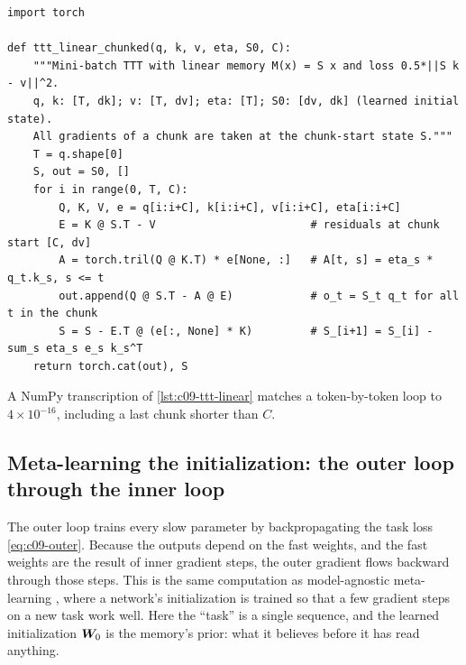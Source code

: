 \begin{lstlisting}[caption={Reference implementation (ours): mini-batch TTT-Linear in its dual form, without the layer norm.},label={lst:c09-ttt-linear}]
import torch

def ttt_linear_chunked(q, k, v, eta, S0, C):
    """Mini-batch TTT with linear memory M(x) = S x and loss 0.5*||S k - v||^2.
    q, k: [T, dk]; v: [T, dv]; eta: [T]; S0: [dv, dk] (learned initial state).
    All gradients of a chunk are taken at the chunk-start state S."""
    T = q.shape[0]
    S, out = S0, []
    for i in range(0, T, C):
        Q, K, V, e = q[i:i+C], k[i:i+C], v[i:i+C], eta[i:i+C]
        E = K @ S.T - V                        # residuals at chunk start [C, dv]
        A = torch.tril(Q @ K.T) * e[None, :]   # A[t, s] = eta_s * q_t.k_s, s <= t
        out.append(Q @ S.T - A @ E)            # o_t = S_t q_t for all t in the chunk
        S = S - E.T @ (e[:, None] * K)         # S_[i+1] = S_[i] - sum_s eta_s e_s k_s^T
    return torch.cat(out), S
\end{lstlisting}

A NumPy transcription of \cref{lst:c09-ttt-linear} matches a token-by-token loop to
$4\times10^{-16}$, including a last chunk shorter than $C$.

\subsection{Meta-learning the initialization: the outer loop through the inner loop}\label{sec:c09-metalearning}

The outer loop trains every slow parameter by backpropagating the task loss
\eqref{eq:c09-outer}. Because the outputs depend on the fast weights, and the fast weights are
the result of inner gradient steps, the outer gradient flows backward through those steps.
This is the same computation as model-agnostic meta-learning \citep{c09-finn2017maml}, where
a network's initialization is trained so that a few gradient steps on a new task work well.
Here the ``task'' is a single sequence, and the learned initialization $\bm{W}_0$ is the memory's
prior: what it believes before it has read anything.


